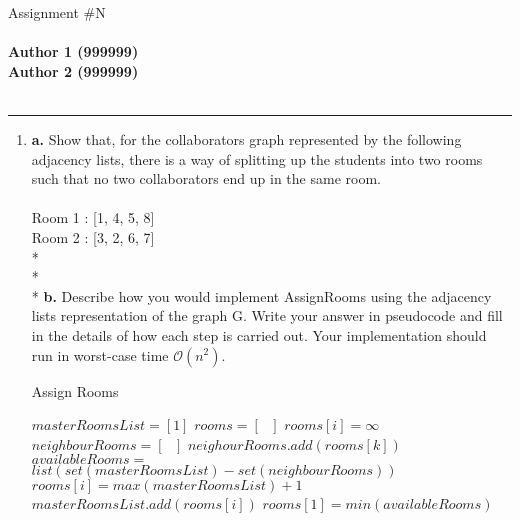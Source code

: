 \documentclass[11pt,twoside]{article}
\begin{document}
\begin{center}
    {\sc \LARGE Assignment \#N } \\ \ \\
    {\bf Author 1 (999999) \\ Author 2 (999999) } \\ \ \\
\end{center}
\hrule
\vrule



\begin{enumerate}

\item
\textbf{a.} Show that, for the collaborators graph represented by the following adjacency lists, there is a way of splitting up the students into two rooms such that no two collaborators end up in the same room.
\\ \\ Room 1 : [1, 4, 5, 8]
\\ Room 2 : [3, 2, 6, 7]
\\* \\* \\* \textbf{b.} Describe how you would implement AssignRooms using the adjacency lists representation of the graph G. Write your answer in pseudocode and fill in the details of how each step is carried out. Your implementation should run in worst-case time $\mathcal{O}(n^2)$.
\begin{algorithm}
\caption{Assign Rooms}\label{euclid}
\begin{algorithmic}[1]
 
    \State $masterRoomsList = [1]$
    \State $rooms = [\text{ }]$
    \State
        \State $rooms[i] = \infty $
    \EndFor
    \State
        \State $neighbourRooms = [\text{ }]$
        \State
            \State $neighourRooms.add(rooms[k])$
        \EndFor
        \State
        \State $availableRooms =$
        \State \indent \indent $list(set(masterRoomsList) - set(neighbourRooms))$
        \State
            \State $rooms[i] = max(masterRoomsList) + 1$
            \State $masterRoomsList.add(rooms[i])$
        \Else
            \State $rooms[1] = min(availableRooms)$
        \EndIf
        \State
    \EndFor
    \State
\EndProcedure
\end{algorithmic}
\end{algorithm}



\end{enumerate}
\end{document}
